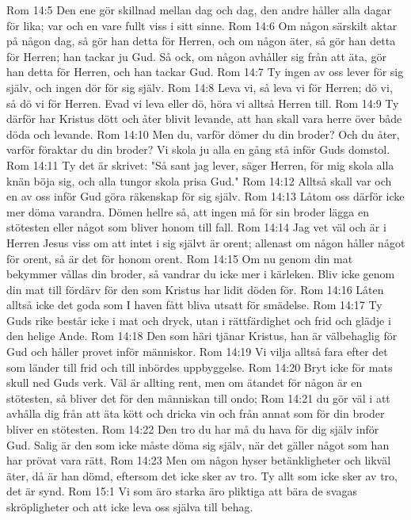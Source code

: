 Rom 14:5  Den ene gör skillnad mellan dag och dag, den andre håller alla dagar för lika; var och en vare fullt viss i sitt sinne.
Rom 14:6  Om någon särskilt aktar på någon dag, så gör han detta för Herren, och om någon äter, så gör han detta för Herren; han tackar ju Gud. Så ock, om någon avhåller sig från att äta, gör han detta för Herren, och han tackar Gud.
Rom 14:7  Ty ingen av oss lever för sig själv, och ingen dör för sig själv.
Rom 14:8  Leva vi, så leva vi för Herren; dö vi, så dö vi för Herren. Evad vi leva eller dö, höra vi alltså Herren till.
Rom 14:9  Ty därför har Kristus dött och åter blivit levande, att han skall vara herre över både döda och levande.
Rom 14:10  Men du, varför dömer du din broder? Och du åter, varför föraktar du din broder? Vi skola ju alla en gång stå inför Guds domstol.
Rom 14:11  Ty det är skrivet: "Så sant jag lever, säger Herren, för mig skola alla knän böja sig, och alla tungor skola prisa Gud."
Rom 14:12  Alltså skall var och en av oss inför Gud göra räkenskap för sig själv.
Rom 14:13  Låtom oss därför icke mer döma varandra. Dömen hellre så, att ingen må för sin broder lägga en stötesten eller något som bliver honom till fall.
Rom 14:14  Jag vet väl och är i Herren Jesus viss om att intet i sig självt är orent; allenast om någon håller något för orent, så är det för honom orent.
Rom 14:15  Om nu genom din mat bekymmer vållas din broder, så vandrar du icke mer i kärleken. Bliv icke genom din mat till fördärv för den som Kristus har lidit döden för.
Rom 14:16  Låten alltså icke det goda som I haven fått bliva utsatt för smädelse.
Rom 14:17  Ty Guds rike består icke i mat och dryck, utan i rättfärdighet och frid och glädje i den helige Ande.
Rom 14:18  Den som häri tjänar Kristus, han är välbehaglig för Gud och håller provet inför människor.
Rom 14:19  Vi vilja alltså fara efter det som länder till frid och till inbördes uppbyggelse.
Rom 14:20  Bryt icke för mats skull ned Guds verk. Väl är allting rent, men om ätandet för någon är en stötesten, så bliver det för den människan till ondo;
Rom 14:21  du gör väl i att avhålla dig från att äta kött och dricka vin och från annat som för din broder bliver en stötesten.
Rom 14:22  Den tro du har må du hava för dig själv inför Gud. Salig är den som icke måste döma sig själv, när det gäller något som han har prövat vara rätt.
Rom 14:23  Men om någon hyser betänkligheter och likväl äter, då är han dömd, eftersom det icke sker av tro. Ty allt som icke sker av tro, det är synd.
Rom 15:1  Vi som äro starka äro pliktiga att bära de svagas skröpligheter och att icke leva oss själva till behag.
